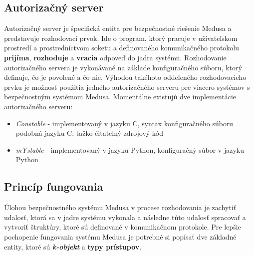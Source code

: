 \subsection{Autorizačný server}
Autorizačný server je špecifická entita pre bezpečnostné riešenie Medusa a predstavuje rozhodovací prvok. Ide o program, ktorý pracuje v užívateľskom prostredí a prostredníctvom soketu a definovaného komunikačného protokolu \textbf{prijíma}, \textbf{rozhoduje} a \textbf{vracia} odpoveď do jadra systému. Rozhodovanie autorizačného servera je vykonávané na základe konfiguračného súboru, ktorý definuje, čo je povolené a čo nie. Výhodou takéhoto oddeleného rozhodovacieho prvku je možnosť použitia jedného autorizačného serveru pre viacero systémov s bezpečnostným systémom Medusa. Momentálne existujú dve implementácie autorizačného serveru:
\begin{itemize}
\item \textit{Constable} - implementovaný v jazyku C, syntax konfiguračného súboru podobná jazyku C, ťažko čitateľný zdrojový kód 
\item \textit{mYstable} - implementovaný v jazyku Python, konfiguračný súbor v jazyku Python
\end{itemize}

\subsection{Princíp fungovania}
Úlohou bezpečnostného systému Medusa v procese rozhodovania je zachytiť udalosť, ktorá sa v jadre systému vykonala a následne túto udalosť spracovať a vytvoriť štruktúry, ktoré sú definované v komunikačnom protokole. Pre lepšie pochopenie fungovania systému Medusa je potrebné si popísať dve základné entity, ktoré sú \textbf{\textit{k-objekt}} a \textbf{typy prístupov}.
